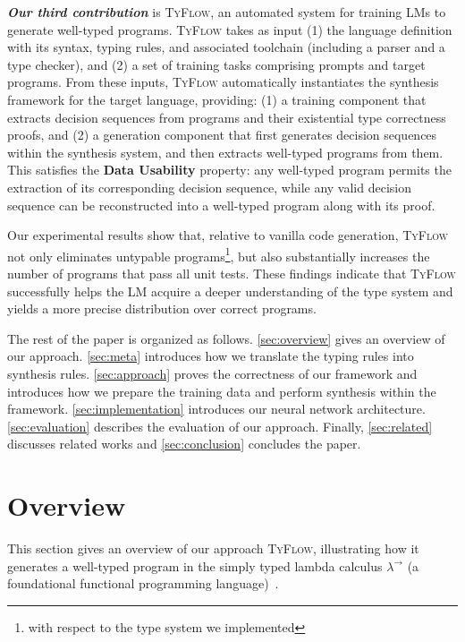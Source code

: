 \documentclass[manuscript,screen]{acmart}
\newcommand{\toolname}[1]{\textsc{#1}}
\newcommand{\mainname}{\toolname{TyFlow}\xspace}
\newcommand{\stlc}{\lambda^{\rightarrow}}
\begin{document}
\textbf{\textit{Our third contribution}} is \mainname, an automated system for training LMs to generate well-typed programs. \mainname takes as input (1) the language definition with its syntax, typing rules, and associated toolchain (including a parser and a type checker), and (2) a set of training tasks comprising prompts and target programs. 
From these inputs, \mainname automatically instantiates the synthesis framework for the target language, providing: (1) a training component that extracts decision sequences from programs and their existential type correctness proofs, and (2) a generation component that first generates decision sequences within the synthesis system, and then extracts well-typed programs from them.
This satisfies the \textbf{Data Usability} property: any well-typed program permits the extraction of its corresponding decision sequence, while any valid decision sequence can be reconstructed into a well-typed program along with its proof.

\smallskip
Our experimental results show that, relative to vanilla code generation, \mainname not only eliminates untypable programs\footnote{with respect to the type system we implemented}, but also substantially increases the number of programs that pass all unit tests. These findings indicate that \mainname successfully helps the LM acquire a deeper understanding of the type system and yields a more precise distribution over correct programs.

The rest of the paper is organized as follows. 
\autoref{sec:overview} gives an overview of our approach. 
\autoref{sec:meta} introduces how we translate the typing rules into synthesis rules. 
\autoref{sec:approach} proves the correctness of our framework and introduces how we prepare the training data and perform synthesis within the framework. 
\autoref{sec:implementation} introduces our neural network architecture. 
\autoref{sec:evaluation} describes the evaluation of our approach. 
Finally, \autoref{sec:related} discusses related works and \autoref{sec:conclusion} concludes the paper. 
\section{Overview \label{sec:overview}}

This section gives an overview of our approach \mainname, illustrating how it generates a well-typed program in the simply typed lambda calculus $\stlc$ (a foundational functional programming language)~\cite{DBLP:journals/jsyml/Church40}.
\end{document}
